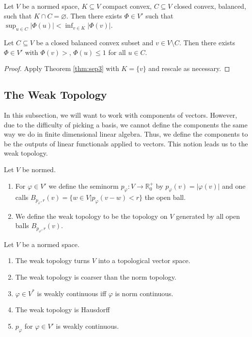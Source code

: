 \documentclass[prb,12pt]{revtex4-2}
\theoremstyle{definition}
\theoremstyle{definition}
\theoremstyle{definition}
\newenvironment{parts}{\begin{enumerate}[label=(\alph*)]}{\end{enumerate}}
\newcommand{\R}{\mathbb{R}}
\begin{document}
\begin{Theorem} \label{thm:sep3}
	Let $V$ be a normed space, $K\subseteq V$ compact convex, $C\subseteq V$ closed convex, balanced, such that $K\cap C=\varnothing$. Then there exists $\Phi\in V'$ such that $\sup_{u\in C}|\Phi(u)| < \inf_{v\in K}|\Phi(v)|$.
\end{Theorem}
\begin{Corollary}
	Let $C\subseteq V$ be a closed balanced convex subset and $v\in V \setminus C$. Then there exists $\Phi\in V'$ with $\Phi(v)>$, $\Phi(u)\le 1$ for all $u\in C$.
\end{Corollary}
\begin{proof}
	Apply Theorem \ref{thm:sep3} with $K=\{v\} $ and rescale as necessary.
\end{proof}
\subsection{The Weak Topology}
In this subsection, we will want to work with components of vectors. However, due to the difficulty of picking a basis, we cannot define the components the same way we do in finite dimensional linear algebra. Thus, we define the components to be the outputs of linear functionals applied to vectors. This notion leads us to the weak topology.
\begin{Definition}
	Let $V$ be normed.
	\begin{parts}
		\item For $\varphi\in V'$ we define the seminorm $p_\varphi:V \to \R_0^+$ by $p_\varphi(v)=|\varphi(v)|$ and one calls $B_{p_\varphi, r}(v) =\{w\in V|p_\varphi(v-w)<r\} $ the open ball.
		\item We define the weak topology to be the topology on $V$ generated by all open balls $B_{p_{\varphi}, r}(v)$.
	\end{parts}
\end{Definition}
\begin{Theorem}
	Let $V$ be a normed space.
	\begin{parts}
		\item The weak topology turns $V$ into a topological vector space.
		\item The weak topology is coarser than the norm topology.
		\item $\varphi\in V^*$ is weakly continuous iff $\varphi$ is norm continuous.
		\item The weak topology is Hausdorff
		\item $p_\varphi$ for $\varphi\in V'$ is weakly continuous.
	\end{parts}
\end{Theorem}
\end{document}
